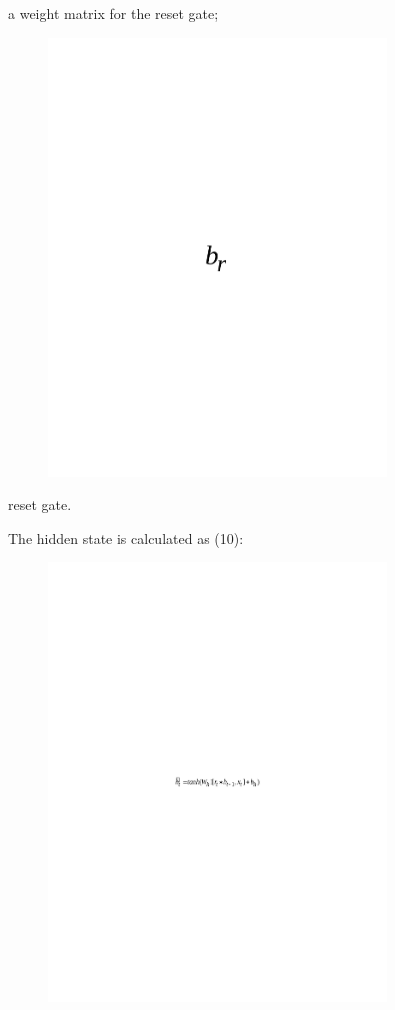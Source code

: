 a weight matrix for the reset gate;
\begin{figure}[H]
	\centering
	\includegraphics[width=0.8\textwidth]{media/ict/image70}
	\caption*{}
\end{figure}

reset gate.

The hidden state is calculated as (10):

\begin{figure}[H]
	\centering
	\includegraphics[width=0.8\textwidth]{media/ict/image71}
	\caption*{}
\end{figure}


